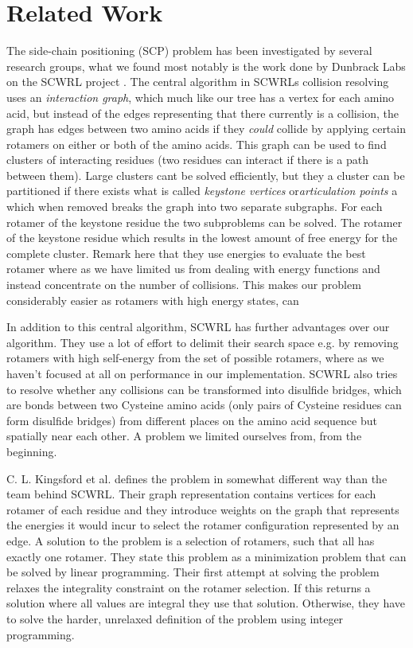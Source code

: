 
\section{Related Work}
The side-chain positioning (SCP) problem has been investigated by
several research groups, what we found most notably is the work done
by Dunbrack Labs on the SCWRL project \cite{canutescu2003graph,
  krivov2009improved}. The central algorithm in SCWRLs collision
resolving uses an \textit{interaction graph}, which much like our tree
has a vertex for each amino acid, but instead of the edges
representing that there currently is a collision, the graph has edges
between two amino acids if they \textit{could} collide by applying
certain rotamers on either or both of the amino acids. This graph can
be used to find clusters of interacting residues (two residues can
interact if there is a path between them). Large clusters cant be
solved efficiently, but they a cluster can be partitioned if there
exists what is called \textit{keystone vertices}
or\textit{articulation points} a which when removed breaks the graph
into two separate subgraphs. For each rotamer of the keystone residue
the two subproblems can be solved. The rotamer of the keystone residue
which results in the lowest amount of free energy for the complete
cluster. Remark here that they use energies to evaluate the best
rotamer where as we have limited us from dealing with energy functions
and instead concentrate on the number of collisions. This makes our
problem considerably easier as rotamers with high energy states, can

In addition to this central algorithm, SCWRL has further advantages
over our algorithm. They use a lot of effort to delimit their search
space e.g. by removing rotamers with high self-energy from the set of
possible rotamers, where as we haven't focused at all on performance
in our implementation. SCWRL also tries to resolve whether any
collisions can be transformed into disulfide bridges, which are bonds
between two Cysteine amino acids (only pairs of Cysteine residues can
form disulfide bridges) from different places on the amino acid
sequence but spatially near each other. A problem we limited ourselves
from, from the beginning.

C. L. Kingsford et al. \cite{kingsford2005solving} defines the problem
in somewhat different way than the team behind SCWRL. Their graph
representation contains vertices for each rotamer of each residue and
they introduce weights on the graph that represents the energies it
would incur to select the rotamer configuration represented by an
edge. A solution to the problem is a selection of rotamers, such that
all has exactly one rotamer. They state this problem as a minimization
problem that can be solved by linear programming. Their first attempt
at solving the problem relaxes the integrality constraint on the
rotamer selection. If this returns a solution where all values are
integral they use that solution. Otherwise, they have to solve the
harder, unrelaxed definition of the problem using integer programming.

